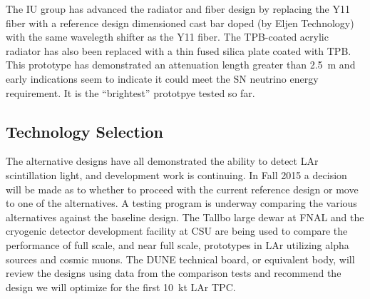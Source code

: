 The IU group has advanced the radiator and fiber design by replacing
the Y11 fiber with a reference design dimensioned cast bar doped (by
Eljen Technology) with the same wavelegth shifter as the Y11
fiber. The TPB-coated acrylic radiator has also been replaced with a
thin fused silica plate coated with TPB. This prototype has
demonstrated an attenuation length greater than 2.5~m and early
indications seem to indicate it could meet the SN neutrino energy
requirement. It is the ``brightest'' prototpye tested so far.

\subsection{Technology Selection}

The alternative designs have all demonstrated the ability to detect
LAr scintillation light, and development work is continuing. In Fall
2015 a decision will be made as to whether to proceed with the current
reference design or move to one of the alternatives. A testing program
is underway comparing the various alternatives against the baseline
design. The Tallbo large dewar at FNAL and the cryogenic detector
development facility at CSU are being used to compare the performance
of full scale, and near full scale, prototypes in LAr utilizing alpha
sources and cosmic muons. The DUNE technical board, or equivalent
body, will review the designs using data from the comparison tests and
recommend the design we will optimize for the first 10~kt LAr TPC.

